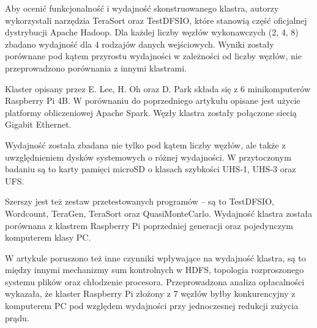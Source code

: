 Aby ocenić funkcjonalność i wydajność skonstruowanego klastra, autorzy wykorzystali narzędzia
TeraSort oraz TestDFSIO, które stanowią część oficjalnej dystrybucji Apache Hadoop.
Dla każdej liczby węzłów wykonawczych (2, 4, 8) zbadano wydajność dla 4 rodzajów danych
wejściowych. Wyniki zostały porównane pod kątem przyrostu wydajności w zależności
od liczby węzłów, nie przeprowadzono porównania z innymi klastrami. \newpage

Klaster opisany przez E. Lee, H. Oh oraz D. Park \cite{rpi-cluster-2} składa się z 6
minikomputerów Raspberry Pi 4B. W porównaniu do poprzedniego artykułu opisane jest
użycie platformy obliczeniowej Apache Spark. Węzły klastra zostały połączone siecią
Gigabit Ethernet.

Wydajność została zbadana nie tylko pod kątem liczby węzłów, ale także z uwzględnieniem
dysków systemowych o różnej wydajności. W przytoczonym badaniu są to karty pamięci
microSD o klasach szybkości UHS-1, UHS-3 oraz UFS.

Szerszy jest też zestaw przetestowanych programów -- są to TestDFSIO, Wordcount, TeraGen,
TeraSort oraz QuasiMonteCarlo. Wydajność klastra została porównana z klastrem Raspberry Pi
poprzedniej generacji oraz pojedynczym komputerem klasy PC.

W artykule poruszono też inne czynniki wpływające na wydajność klastra, są to między innymi
mechanizmy sum kontrolnych w HDFS, topologia rozproszonego systemu plików oraz chłodzenie
procesora. Przeprowadzona analiza opłacalności wykazała, że klaster Raspberry Pi złożony
z 7 węzłów byłby konkurencyjny z komputerem PC pod względem wydajności przy jednoczesnej
redukcji zużycia prądu.
